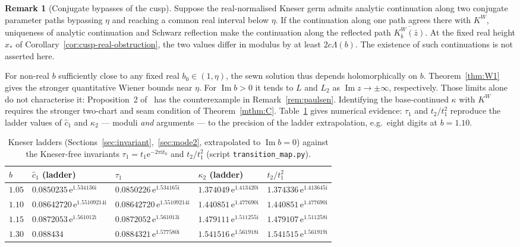 \documentclass[11pt]{amsart}
\theoremstyle{definition}
\newtheorem{remark}[theorem]{Remark}
\newcommand{\Kk}{K}
\newcommand{\eee}{\mathrm{e}}
\newcommand{\ii}{\mathrm{i}}
\begin{document}
\begin{remark}[Conjugate bypasses of the cusp]
Suppose the real-normalised Kneser germ admits analytic continuation
along two conjugate parameter paths bypassing $\eta$ and reaching a
common real interval below $\eta$.  If the continuation along one path
agrees there with $\Kk^W$, uniqueness of analytic continuation and
Schwarz reflection make the continuation along the reflected path
$\overline{\Kk^W_{\bar b}(\bar z)}$.  At the fixed real height $x_*$ of
Corollary~\ref{cor:cusp-real-obstruction}, the two values differ in
modulus by at least $2c\Lambda(b)$.  The existence of such
continuations is not asserted here.
\end{remark}

For non-real $b$ sufficiently close to any fixed real $b_0\in(1,\eta)$,
the sewn solution thus depends holomorphically on $b$.
Theorem~\ref{thm:W1} gives the stronger quantitative Wiener bounds near
$\eta$.  For $\operatorname{Im}b>0$ it tends to $L$ and $L_2$ as
$\operatorname{Im}z\to\pm\infty$, respectively.  Those limits alone do not characterise
it: Proposition~2 of~\cite{Paulsen2019} has the counterexample in
Remark~\ref{rem:paulsen}.  Identifying the base-continued $\kappa$ with
$\Kk^W$ requires the stronger two-chart and seam condition of
Theorem~\ref{mthm:C}.  Table~\ref{tab:tau} gives numerical evidence:
$\tau_1$ and $t_2/t_1^2$ reproduce the ladder values of $\hat c_1$ and
$\kappa_2$ --- moduli \emph{and} arguments --- to the precision of the
ladder extrapolation, e.g.\ eight digits at $b=1.10$.

\begin{table}[htbp]
\centering
\caption{Kneser ladders (Sections~\ref{sec:invariant},~\ref{sec:mode2}, extrapolated
to $\operatorname{Im}b=0$) against the Kneser-free invariants
$\tau_1=t_1\eee^{-2\pi\ii t_0}$ and $t_2/t_1^2$ (script \texttt{transition\_map.py}).}
\label{tab:tau}
\small\setlength{\tabcolsep}{3.5pt}
\begin{tabular}{lllll}
\toprule
$b$ & $\hat c_1$ (ladder) & $\tau_1$ & $\kappa_2$ (ladder) & $t_2/t_1^2$\\
\midrule
$1.05$ & $0.0850235\,\eee^{1.534136\ii}$ & $0.0850226\,\eee^{1.534165\ii}$ & $1.374049\,\eee^{1.413420\ii}$ & $1.374336\,\eee^{1.413645\ii}$\\
$1.10$ & $0.08642720\,\eee^{1.55109214\ii}$ & $0.08642720\,\eee^{1.55109214\ii}$ & $1.440851\,\eee^{1.477690\ii}$ & $1.440851\,\eee^{1.477690\ii}$\\
$1.15$ & $0.0872053\,\eee^{1.561012\ii}$ & $0.0872052\,\eee^{1.561013\ii}$ & $1.479111\,\eee^{1.511255\ii}$ & $1.479107\,\eee^{1.511258\ii}$\\
$1.30$ & $0.088434$ & $0.0884321\,\eee^{1.577580\ii}$ & $1.541516\,\eee^{1.561918\ii}$ & $1.541515\,\eee^{1.561919\ii}$\\
\bottomrule
\end{tabular}
\end{table}
\end{document}
